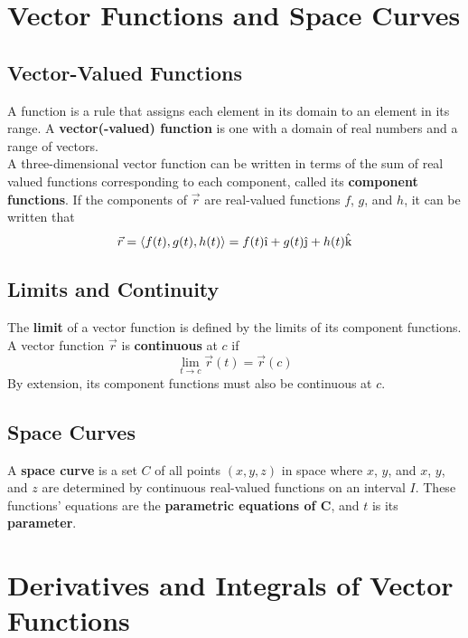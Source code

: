 \documentclass[../Calculus_\Roman{3}]{subfiles}
\begin{document}
	\section{Vector Functions and Space Curves}
		\subsection*{Vector-Valued Functions}
			A function is a rule that assigns each element in its domain to an element in its range. A \textbf{vector(-valued) function} is one with a domain of real numbers and a range of vectors. \\
			A three-dimensional vector function can be written in terms of the sum of real valued functions corresponding to each component, called its \textbf{component functions}. If the components of $\vec{r}$ are real-valued functions $f$, $g$, and $h$, it can be written that
				\[\vec{r} = \langle f(t), g(t), h(t) \rangle = f(t)\vi + g(t)\vj + h(t)\vk\]
		\subsection*{Limits and Continuity}
				The \textbf{limit} of a vector function is defined by the limits of its component functions.
				A vector function $\vec{r}$ is \textbf{continuous} at $c$ if	
					\[\lim_{t\to c}\vec{r}(t) = \vec{r}(c)\]
				By extension, its component functions must also be continuous at $c$.
		\subsection*{Space Curves}
			A \textbf{space curve} is a set $C$ of all points $(x, y, z)$ in space where $x$, $y$, and $x$, $y$, and $z$ are determined by continuous real-valued functions on an interval $I$. These functions' equations are the \textbf{parametric equations of $\bm{C}$}, and $t$ is its \textbf{parameter}.
	\section{Derivatives and Integrals of Vector Functions}
\end{document}
